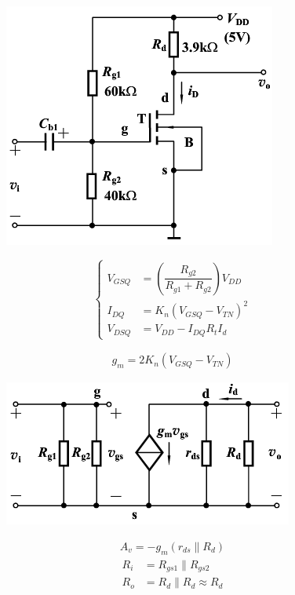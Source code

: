 \begin{figure}[H]
  \centering
  \includegraphics[width=0.5\linewidth]{figures/MOSFET-Common-S}
  \label{fig:}
\end{figure}

\begin{equation*}
  \left\{
  \begin{aligned}
    V_{GSQ} &= \left( \dfrac{R_{g2}}{R_{g1} + R_{g2}}  \right) V_{DD} \\
    I_{DQ} &= K_n \left( V_{GSQ} - V_{TN} \right)^2 \\
    V_{DSQ} &= V_{DD} - I_{DQ} R_tI_d
  \end{aligned}
  \right.
\end{equation*}

\begin{equation*}
  \begin{aligned}
    g_m = 2 K_n \left( V_{GSQ} - V_{TN} \right)
  \end{aligned}
\end{equation*}

\begin{figure}[H]
  \centering
  \includegraphics[width=0.5\linewidth]{figures/MOSFET-Common-Ss}
  \label{fig:}
\end{figure}

\begin{equation*}
  \begin{aligned}
    A_v = - g_m \left( r_{ds} \parallel R_d \right)
  \end{aligned}
\end{equation*}
\begin{equation*}
  \begin{aligned}
    R_i &= R_{gs1} \parallel R_{gs2} \\
    R_o &= R_d \parallel R_d \approx R_d
  \end{aligned}
\end{equation*}

